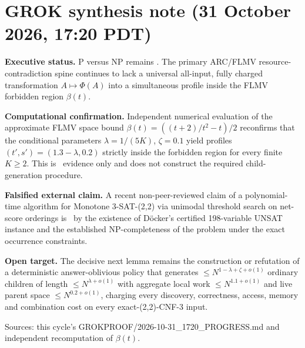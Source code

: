 \section*{GROK synthesis note (31 October 2026, 17:20 PDT)}

\noindent\textbf{Executive status.}
P versus NP remains \OPEN. The primary ARC/FLMV resource-contradiction spine continues to lack a universal all-input, fully charged transformation \(A\mapsto\Phi(A)\) into a simultaneous profile inside the FLMV forbidden region \(\beta(t)\).

\noindent\textbf{Computational confirmation.}
Independent numerical evaluation of the approximate FLMV space bound \(\beta(t)=((t+2)/t^2-t)/2\) reconfirms that the conditional parameters \(\lambda=1/(5K)\), \(\zeta=0.1\) yield profiles \((t',s')=(1.3-\lambda,0.2)\) strictly inside the forbidden region for every finite \(K\ge 2\). This is \COMPUTATIONAL\ evidence only and does not construct the required child-generation procedure.

\noindent\textbf{Falsified external claim.}
A recent non-peer-reviewed claim of a polynomial-time algorithm for Monotone 3-SAT-(2,2) via unimodal threshold search on net-score orderings is \FALSIFIED\ by the existence of Döcker's certified 198-variable UNSAT instance and the established NP-completeness of the problem under the exact occurrence constraints.

\noindent\textbf{Open target.}
The decisive next lemma remains the construction or refutation of a deterministic answer-oblivious policy that generates \(\le N^{1-\lambda+\zeta+o(1)}\) ordinary children of length \(\le N^{\lambda+o(1)}\) with aggregate local work \(\le N^{1.1+o(1)}\) and live parent space \(\le N^{0.2+o(1)}\), charging every discovery, correctness, access, memory and combination cost on every exact-(2,2)-CNF-3 input.

Sources: this cycle's GROKPROOF/2026-10-31_1720_PROGRESS.md and independent recomputation of \(\beta(t)\).
